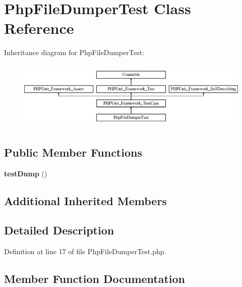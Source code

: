 \section{Php\+File\+Dumper\+Test Class Reference}
\label{class_symfony_1_1_component_1_1_translation_1_1_tests_1_1_dumper_1_1_php_file_dumper_test}
Inheritance diagram for Php\+File\+Dumper\+Test\+:\begin{figure}[H]
\begin{center}
\leavevmode
\includegraphics[height=3.303835cm]{class_symfony_1_1_component_1_1_translation_1_1_tests_1_1_dumper_1_1_php_file_dumper_test}
\end{center}
\end{figure}
\subsection*{Public Member Functions}
\begin{DoxyCompactItemize}
\item 
{\bf test\+Dump} ()
\end{DoxyCompactItemize}
\subsection*{Additional Inherited Members}


\subsection{Detailed Description}


Definition at line 17 of file Php\+File\+Dumper\+Test.\+php.



\subsection{Member Function Documentation}
